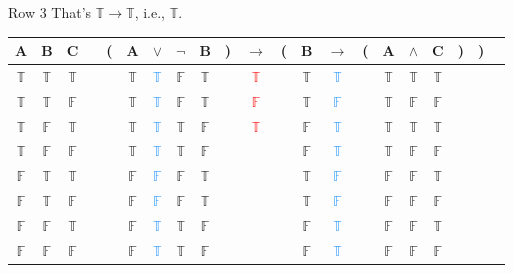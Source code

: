 \documentclass[
  ignorenonframetext,
]{beamer}
\renewcommand{\,}{\text{, }}
\def\True{\mathbb{T}}
\def\False{\mathbb{F}}
\begin{document}
\begin{frame}{Row 3}
\protect\hypertarget{row-3-1}{}
That's \(\True \rightarrow \True\), i.e., \(\True\).

\begin{center}

\begin{tabular}{@{ }c@{ }@{ }c@{ }@{ }c | c@{ }@{}c@{}@{ }c@{ }@{ }c@{ }@{ }c@{ }@{ }c@{ }@{}c@{}@{ }c@{ }@{}c@{}@{ }c@{ }@{ }c@{ }@{}c@{}@{ }c@{ }@{ }c@{ }@{ }c@{ }@{}c@{}@{}c@{}@{ }c}
A & B & C &  & ( & A & $\vee$ & $\neg$ & B & ) & $\rightarrow$ & ( & B & $\rightarrow$ & ( & A & $\wedge$ & C & ) & ) & \\
\hline 
 $\True$ & $\True$ & $\True$ &  &  & $\True$ & \textcolor{dodgerblue}{$\True$} & $\False$ & $\True$ &  &\textcolor{red}{$\True$}&  & $\True$ & \textcolor{dodgerblue}{$\True$} &  & $\True$ & $\True$ & $\True$ &  &  & \\
 $\True$ & $\True$ & $\False$ &  &  & $\True$ & \textcolor{dodgerblue}{$\True$} & $\False$ & $\True$ &  &\textcolor{red}{$\False$}&  & $\True$ & \textcolor{dodgerblue}{$\False$} &  & $\True$ & $\False$ & $\False$ &  &  & \\
 $\True$ & $\False$ & $\True$ &  &  & $\True$ & \textcolor{dodgerblue}{$\True$} & $\True$ & $\False$ &  &\textcolor{red}{$\True$}&  & $\False$ & \textcolor{dodgerblue}{$\True$} &  & $\True$ & $\True$ & $\True$ &  &  & \\
 $\True$ & $\False$ & $\False$ &  &  & $\True$ & \textcolor{dodgerblue}{$\True$} & $\True$ & $\False$ &  &&  & $\False$ & \textcolor{dodgerblue}{$\True$} &  & $\True$ & $\False$ & $\False$ &  &  & \\
 $\False$ & $\True$ & $\True$ &  &  & $\False$ & \textcolor{dodgerblue}{$\False$} & $\False$ & $\True$ &  &&  & $\True$ & \textcolor{dodgerblue}{$\False$} &  & $\False$ & $\False$ & $\True$ &  &  & \\
 $\False$ & $\True$ & $\False$ &  &  & $\False$ & \textcolor{dodgerblue}{$\False$} & $\False$ & $\True$ &  &&  & $\True$ & \textcolor{dodgerblue}{$\False$} &  & $\False$ & $\False$ & $\False$ &  &  & \\
 $\False$ & $\False$ & $\True$ &  &  & $\False$ & \textcolor{dodgerblue}{$\True$} & $\True$ & $\False$ &  &&  & $\False$ & \textcolor{dodgerblue}{$\True$} &  & $\False$ & $\False$ & $\True$ &  &  & \\
 $\False$ & $\False$ & $\False$ &  &  & $\False$ & \textcolor{dodgerblue}{$\True$} & $\True$ & $\False$ &  &&  & $\False$ & \textcolor{dodgerblue}{$\True$} &  & $\False$ & $\False$ & $\False$ &  &  & \\
\end{tabular}

\end{center}
\end{frame}
\end{document}
